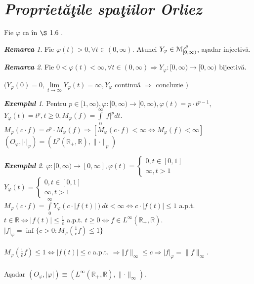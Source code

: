 \documentclass[ a4paper, 12pt]{report}
\theoremstyle{remark}
\newtheorem{remarc}{\bf Remarca}[section]
\newtheorem{exemple}{\bf Exemplul}[section]
\numberwithin{equation}{section}
\begin{document}
\section{\textit{Propriet\u a\c tile spa\c tiilor Orliez}}
Fie $\varphi$ ca \^in $\S$ 1.6 .\\
\begin{remarc}
Fie $\varphi(t)>0, \forall t \in (0,\infty)$. Atunci  $Y_\varphi \in \mathcal{M}_{[0,\infty)}^{\mc}$, a\c sadar injectiv\u a.
\end{remarc}
\begin{remarc}
Fie $0<\varphi(t) < \infty, \forall t \in (0,\infty) \Rightarrow Y_\varphi : [0,\infty) \rightarrow [0,\infty)$ bijectiv\u a.
\end{remarc}
$\big(Y_\varphi(0) = 0, \lim\limits_{t \rightarrow \infty} Y_\varphi(t) = \infty, Y_\varphi$ continu\u a $ \Rightarrow$ concluzie $\big)$
\begin{exemple}
Pentru $p \in [1,\infty), \varphi : [0,\infty) \rightarrow [0,\infty), \varphi(t) = p \cdot t^{p-1},$\\
$Y_\varphi(t) = t^p, t \geq 0, M_\varphi(f) = \int\limits_{0}^{\infty}\lvert f \rvert^p dt.$\\
$M_\varphi(c \cdot f) = c^p \cdot M_\varphi(f) \Rightarrow [M_\varphi(c \cdot f) < \infty \Leftrightarrow M_\varphi(f) < \infty]$\\
$(O_\varphi, \lvert \cdot \rvert_\varphi) = (L^p(\mathbb{R}_+, \mathbb{R}), \lVert \cdot \rVert_p)$
\end{exemple}
\begin{exemple}
$\varphi : [0,\infty) \rightarrow [0,\infty] , \varphi(t) = \begin{cases}
0,t \in [0,1]\\
\infty, t>1
\end{cases}$\\
$Y_\varphi(t) = \begin{cases}
0,t \in [0,1]\\
\infty, t>1
\end{cases}$\\

$M_\varphi(c \cdot f) = \int\limits_{0}^{\infty} Y_\varphi(c \cdot \lvert f(t) \rvert) dt < \infty \Leftrightarrow c \cdot \lvert f(t) \rvert \leq 1$ a.p.t. $t \in \mathbb{R} \Leftrightarrow \lvert f(t) \rvert \leq \frac{1}{c}$ a.p.t. $t \geq 0 \Leftrightarrow f \in L^{\infty}(\mathbb{R}_+,\mathbb{R}).$\\
$\lvert f \rvert_\varphi = \inf\{c>0:M_\varphi(\frac{1}{c}f) \leq 1\}$\\
\\
$M_\varphi(\frac{1}{c}f) \leq 1 \Leftrightarrow \lvert f(t) \rvert \leq c$  a.p.t. $\Rightarrow \Vert f \rVert_{\infty} \leq c \Rightarrow \lvert f\rvert_\varphi = \lVert f \rVert_{\infty}$.\\
\\
A\c sadar $ (O_\varphi, \lvert \varphi \rvert) \equiv (L^\infty(\mathbb{R}_+, \mathbb{R}),\lVert \cdot \rVert_\infty).$
\end{exemple}
\end{document}
